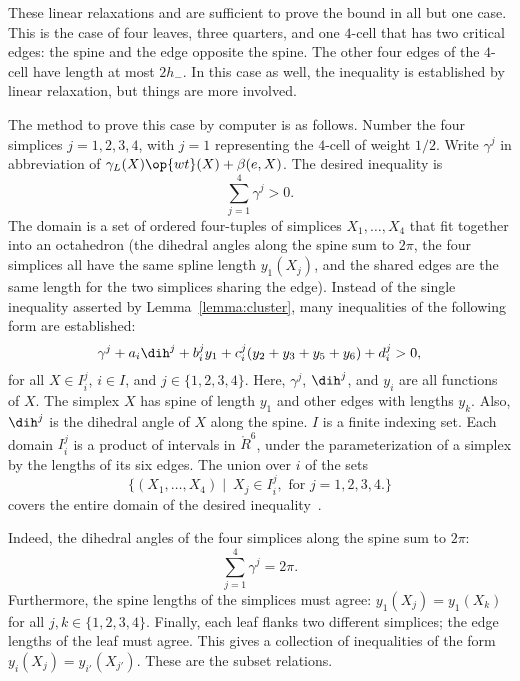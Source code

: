 These linear relaxations and are sufficient to prove the bound in all
but one case.  This is the case of four leaves, three quarters, and
one $4$-cell that has two critical edges: the spine and the edge
opposite the spine.  The other four edges of the $4$-cell have length
at most $2h_-$.  In this case as well, the inequality is established
by linear relaxation, but things are more involved.

The method to prove this case by computer is as follows.  Number the
four simplices $j=1,2,3,4$, with $j=1$ representing the $4$-cell of
weight $1/2$.  Write $\gamma^j$ in abbreviation of
$\gamma_L(X)\op{wt}(X) + \beta(e,X)$.  The desired inequality is
\begin{equation}\label{eqn:gpos}
\sum_{j=1}^4 \gamma^j > 0.
\end{equation}
The domain is a set of ordered four-tuples of simplices
$X_1,\ldots,X_4$ that fit together into an octahedron (the dihedral
angles along the spine sum to $2\pi$, the four simplices all have the
same spline length $y_1(X_j)$, and the shared edges are the same
length for the two simplices sharing the edge).  Instead of the single
inequality asserted by Lemma~\ref{lemma:cluster}, many inequalities of
the following form are established:
\begin{equation}\label{eqn:gpart}
\gamma^j + a_i \dih^j + b_i^j y_1 + c_i^j (y_2+y_3+y_5+y_6) + d_i^j > 0, 
\end{equation}
for all $X \in I_i^j$, \quad $i \in I$, and $j\in \{1,2,3,4\}$.  Here,
$\gamma^j$, $\dih^j$, and $y_i$ are all functions of $X$.  The simplex
$X$ has spine of length $y_1$ and other edges with lengths $y_k$.
Also, $\dih^j$ is the dihedral angle of $X$ along the spine.  $I$ is a
finite indexing set.  Each domain $I_i^j$ is a product of intervals in
$\ring{R}^6$, under the parameterization of a simplex by the lengths
of its six edges.  The union over $i$ of the sets
\begin{displaymath}
\{(X_1,\ldots,X_4)\mid~ X_j \in I_i^j,\text{ for } j=1,2,3,4.\}
\end{displaymath}
covers the entire domain of the desired inequality~.   

  Indeed, the
dihedral angles of the four simplices along the spine sum to $2\pi$:
\begin{displaymath}
\sum_{j=1}^4 \gamma^j = 2\pi.
\end{displaymath}
Furthermore, the spine lengths of the simplices must agree: $y_1(X_j)
= y_1(X_k)$ for all $j,k\in\{1,2,3,4\}$.  Finally, each leaf flanks
two different simplices; the edge lengths of the leaf must agree.
This gives a collection of inequalities of the form $y_i(X_j) =
y_{i'}(X_{j'})$.  These are the subset relations.

